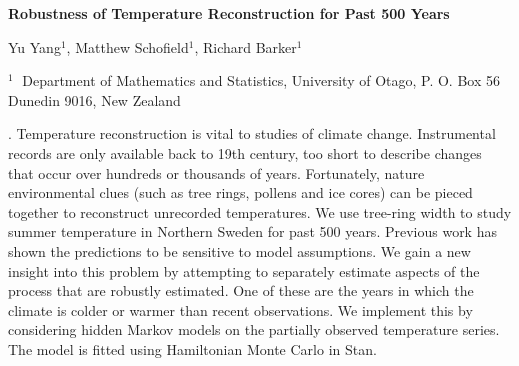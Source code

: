 \documentclass[12pt]{article}
\begin{document}
\begin{flushleft}


{\LARGE\bf Robustness of Temperature Reconstruction for Past 500 Years}


\vspace{1.0cm}

Yu Yang$^1$, Matthew Schofield$^1$, Richard Barker$^1$

\begin{description}

\item $^{1} \;$ Department of Mathematics and Statistics, University of Otago, 
P. O. Box 56 Dunedin 9016, New Zealand


\end{description}

\end{flushleft}


\vspace{0.75cm}

. Temperature reconstruction is vital to studies of climate change. Instrumental records are only available back to 19th century, too short to describe changes that occur over hundreds or thousands of years. Fortunately, nature environmental clues (such as tree rings, pollens and ice cores) can be pieced together to reconstruct unrecorded temperatures. We use tree-ring width to study summer temperature in Northern Sweden for past 500 years. Previous work has shown the predictions to be sensitive to model assumptions. We gain a new insight into this problem by attempting to separately estimate aspects of the process that are robustly estimated.  One of these are the years in which the climate is colder or warmer than recent observations.  We implement this by considering hidden Markov models on the partially observed temperature series.
The model is fitted using Hamiltonian Monte Carlo in Stan.

\end{document}
